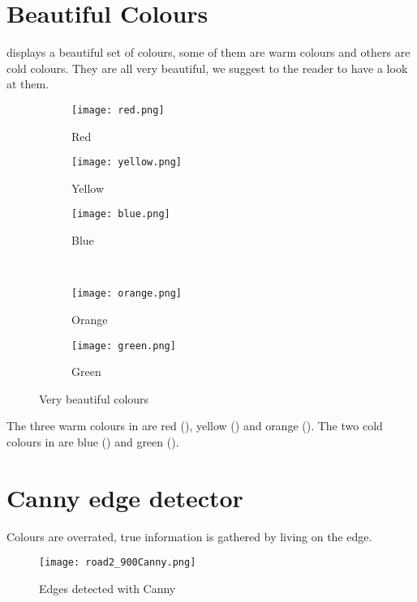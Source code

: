 \section{Beautiful Colours}

 displays a beautiful set of colours, some of them are warm colours and others are cold colours. They are all very beautiful, we suggest to the reader to have a look at them.
\begin{figure}[h!]
    \centering
    \begin{subfigure}[b]{0.3\textwidth}
        \texttt{[image: red.png]}
        \caption{Red}
        \label{fig:red}
    \end{subfigure}
    \quad
    \begin{subfigure}[b]{0.3\textwidth}
        \texttt{[image: yellow.png]}
        \caption{Yellow}
        \label{fig:yellow}
    \end{subfigure}
    \quad
    \begin{subfigure}[b]{0.3\textwidth}
        \texttt{[image: blue.png]}
        \caption{Blue}
        \label{fig:blue}
    \end{subfigure}
    \\
    \begin{subfigure}[b]{0.3\textwidth}
        \texttt{[image: orange.png]}
        \caption{Orange}
        \label{fig:orange}
    \end{subfigure}
    \quad
    \begin{subfigure}[b]{0.3\textwidth}
        \texttt{[image: green.png]}
        \caption{Green}
        \label{fig:green}
    \end{subfigure}
    \caption{Very beautiful colours}
    \label{fig:colours}
\end{figure}

The three warm colours in  are red (), yellow () and orange (). The two cold colours in  are blue () and green ().

\clearpage

\section{Canny edge detector}

Colours are overrated, true information is gathered by living on the edge.

\begin{figure}[h!]
    \centering
    \texttt{[image: road2\_900Canny.png]}
    \caption{Edges detected with Canny}
    \label{fig:road2_canny}
\end{figure}


